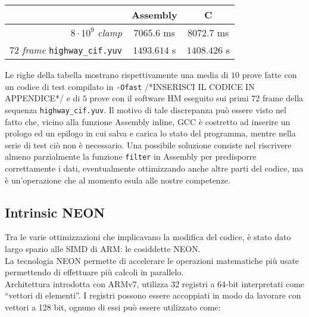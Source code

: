 \begin{table}[H]
	\centering
  \begin{tabular}{|r|c|c|}
    \hline
    
    & \textbf{Assembly} & \textbf{C} \\ 
    
    \hline
    \hline
    \hline
    
    $8 \cdot 10^9$ \textit{clamp} & $7065.6$ ms & $8072.7$ ms \\
    
    \hline
    
    $72$ \textit{frame} \verb|highway_cif.yuv| & $1493.614$ s &  $1408.426$ s \\
    
    \hline
  \end{tabular}
\end{table}

Le righe della tabella mostrano rispettivamente una media di $10$ prove fatte 
con un codice di test compilato in \verb|-Ofast| /*INSERISCI IL CODICE IN 
APPENDICE*/ e di $5$ prove con il software HM eseguito sui primi $72$ 
frame della sequenza \verb|highway_cif.yuv|.\newline
Il motivo di tale discrepanza può essere visto nel fatto che, vicino alla 
funzione Assembly inline, GCC è costretto ad inserire un prologo ed un epilogo 
in cui salva e carica lo stato del programma, mentre nella serie di test ciò 
non è necessario.\newline
Una possibile soluzione consiste nel riscrivere almeno parzialmente la funzione 
\verb|filter| in Assembly per predisporre correttamente i dati, eventualmente
ottimizzando anche altre parti del codice, ma è un'operazione che al momento 
esula alle nostre competenze.

\subsection{Intrinsic NEON}

Tra le varie ottimizzazioni che implicavano la modifica del codice, è stato 
dato largo spazio alle SIMD di ARM: le cosiddette NEON.\\
La tecnologia NEON permette di accelerare le operazioni matematiche più usate 
permettendo di effettuare più calcoli in parallelo.\\
Architettura introdotta con ARMv7, utilizza 32 registri a 64-bit interpretati 
come ``vettori di elementi''. I registri possono essere accoppiati in modo da 
lavorare con vettori a 128 bit, ognuno di essi può essere utilizzato come:

